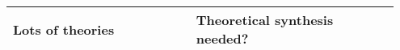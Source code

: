 \begin{table}
\begin{tabular}{>{\raggedright\arraybackslash}p{0.45\linewidth} 
>{\raggedright\arraybackslash}p{0.50\linewidth}}
\vspace{-0.5em} Lots of theories & 
\vspace{-0.5em} Theoretical synthesis needed?                                                                         \\ 

\hline
\end{tabular}
\end{table}
